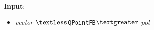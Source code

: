 \documentclass[a4paper, 12pt]{article}
\begin{document}
\textbf{Input}:
\begin{itemize}
\item \textsl{vector} $\textless$\texttt{QPointFB}$\textgreater$ $pol$
\end{itemize}

\end{document}
